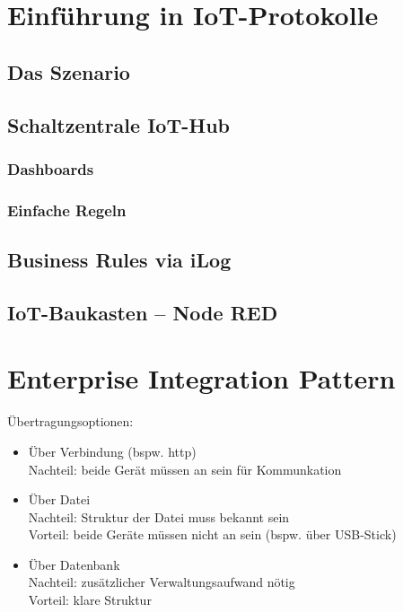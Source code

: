 \section{Einführung in IoT-Protokolle}
\subsection{Das Szenario}
\subsection{Schaltzentrale IoT-Hub}
\subsubsection{Dashboards}
\subsubsection{Einfache Regeln}

\subsection{Business Rules via iLog}

\subsection{IoT-Baukasten -- Node RED}

\section{Enterprise Integration Pattern}

Übertragungsoptionen:
\begin{itemize}
\item Über Verbindung (bspw. http)\\
Nachteil: beide Gerät müssen an sein für Kommunkation
\item Über Datei\\
Nachteil: Struktur der Datei muss bekannt sein\\
Vorteil: beide Geräte müssen nicht an sein (bspw. über USB-Stick)
\item Über Datenbank\\
Nachteil: zusätzlicher Verwaltungsaufwand nötig\\
Vorteil: klare Struktur
\end{itemize}

